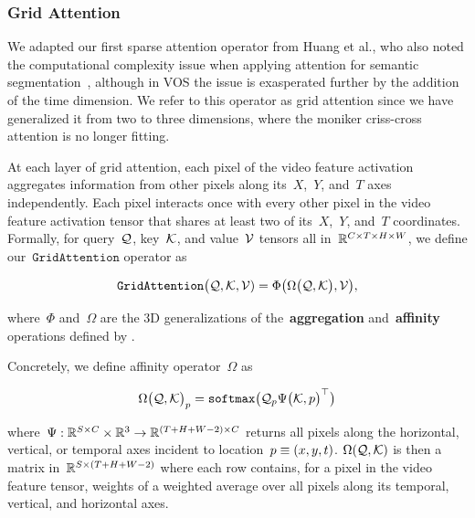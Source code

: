 \subsubsection{Grid Attention}

We adapted our first sparse attention operator from Huang et al., who also
noted the computational complexity issue when applying attention for semantic
segmentation~\citep{huang2018ccnet}, although in VOS the issue is exasperated
further by the addition of the time dimension.
We refer to this operator as grid attention since we have generalized it from
two to three dimensions, where the moniker criss-cross attention is no longer
fitting.

At each layer of grid attention, each pixel of the video feature activation
aggregates information from other pixels along its~$X$,~$Y$, and~$T$ axes
independently.
Each pixel interacts once with every other pixel in the video feature
activation tensor that shares at least two of its~$X$,~$Y$, and~$T$
coordinates.
Formally, for query~$\mathcal{Q}{}$, key~$\mathcal{K}{}$, and
value~$\mathcal{V}{}$ tensors all in~$\mathbb{R}{}^{C\times T\times H\times W}$, we
define our~$\mathtt{GridAttention}$ operator as

\begin{equation}
\mathtt{GridAttention}{\big(\mathcal{Q}{}, \mathcal{K}{}, \mathcal{V}{})} = \Phi\big(\Omega\big(\mathcal{Q}{}, \mathcal{K}{}\big), \mathcal{V}{}\big),
\label{eqn:gridattndefn}
\end{equation}

\noindent where~$\Phi$ and~$\Omega$ are the 3D generalizations of
the~\textbf{aggregation} and~\textbf{affinity} operations defined by
\citet{huang2018ccnet}.

Concretely, we define affinity operator~$\Omega$ as

\begin{equation}
        {\Omega\big(\mathcal{Q}{}, \mathcal{K}{}\big)}_p{} = \mathtt{softmax}{}\big(\mathcal{Q}{}_p{} {\Psi\big(\mathcal{K}{}, p{}\big)}^\top\big)
\label{eqn:gridattndefn}
\end{equation}

\noindent where~$\Psi : \mathbb{R}{}^{S\times C} \times \mathbb{R}{}^3 \rightarrow \mathbb{R}{}^{(T + H + W - 2)\times C}$
returns all pixels along the horizontal, vertical, or temporal axes incident to
location~$p{} \equiv (x, y, t)$.
$\Omega(\mathcal{Q}{}, \mathcal{K}{})$ is then a matrix
in~$\mathbb{R}{}^{S\times (T + H + W - 2)}$ where each row contains, for a pixel in
the video feature tensor, weights of a weighted average over all pixels along
its temporal, vertical, and horizontal axes.

